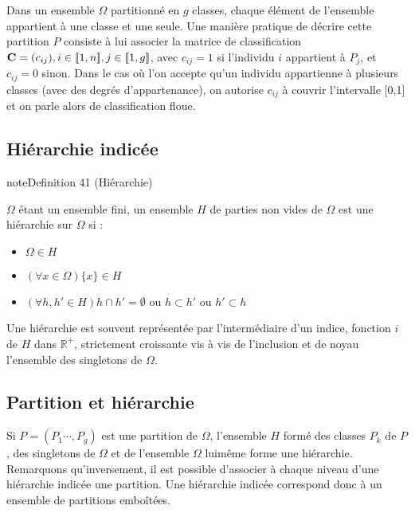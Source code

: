 \documentclass[letterpaper,10pt,english]{jupyterBook}
\begin{document}
\sphinxAtStartPar
Dans un ensemble  \(\Omega\) partitionné en \(g\) classes, chaque élément de l’ensemble appartient à une classe et une seule. Une manière pratique de décrire cette partition \(P\) consiste à lui associer la matrice de classification \({\bf C}=(c_{ij}), i\in [\![1,n]\!], j\in [\![1,g]\!]\), avec \(c_{ij}=1\) si l’individu \(i\) appartient à \(P_j\), et \(c_{ij}=0\) sinon. Dans le cas où l’on accepte qu’un individu appartienne à plusieurs classes (avec des degrés d’appartenance), on autorise \(c_{ij}\) à couvrir l’intervalle {[}0,1{]} et on parle alors de classification floue.


\subsection{Hiérarchie indicée}
\label{\detokenize{clustering:hierarchie-indicee}}
\ignorespaces \label{clustering:definition-1}
\begin{sphinxadmonition}{note}{Definition 41 (Hiérarchie)}



\sphinxAtStartPar
\(\Omega\) étant un ensemble fini, un ensemble \(H\) de parties non vides de \(\Omega\) est une hiérarchie sur \(\Omega\) si :
\begin{itemize}
\item {} 
\sphinxAtStartPar
\(\Omega \in H\)

\item {} 
\sphinxAtStartPar
\((\forall x\in \Omega) \{x\}\in H\)

\item {} 
\sphinxAtStartPar
\((\forall h,h'\in H) h\cap h'=\emptyset\) ou \(h\subset h'\) ou \(h'\subset h\)

\end{itemize}
\end{sphinxadmonition}

\sphinxAtStartPar
Une hiérarchie est souvent représentée par l’intermédiaire d’un indice, fonction \(i\) de \(H\) dans \(\mathbb{R}^+\), strictement croissante vis à vis de l’inclusion et de noyau l’ensemble des singletons de \(\Omega\).


\subsection{Partition et hiérarchie}
\label{\detokenize{clustering:partition-et-hierarchie}}
\sphinxAtStartPar
Si \(P =(P_1 \cdots,P_g)\) est une partition de \(\Omega\), l’ensemble \(H\) formé des classes \(P_k\) de \(P\), des singletons de   \(\Omega\) et de l’ensemble  \(\Omega\) lui\sphinxhyphen{}même forme une hiérarchie. Remarquons qu’inversement, il est possible d’associer à chaque niveau d’une hiérarchie indicée une partition. Une hiérarchie indicée correspond donc à un ensemble de partitions emboîtées.
\end{document}
